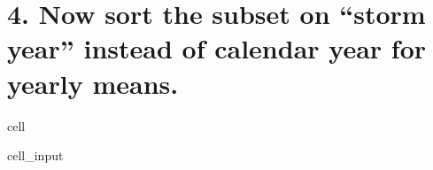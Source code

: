 \documentclass[letterpaper,10pt,english]{jupyterBook}
\begin{document}
\section{4. Now sort the subset on “storm year” instead of calendar year for yearly means.}
\label{\detokenize{notebooks/regional_and_local/SL_anomaly_annual:now-sort-the-subset-on-storm-year-instead-of-calendar-year-for-yearly-means}}
\begin{sphinxuseclass}{cell}\begin{sphinxVerbatimInput}

\begin{sphinxuseclass}{cell_input}
\begin{sphinxVerbatim}[commandchars=\\\{\}]
  

  

\end{sphinxVerbatim}

\end{sphinxuseclass}\end{sphinxVerbatimInput}
\begin{sphinxVerbatimOutput}


\end{sphinxVerbatimOutput}
\end{sphinxuseclass}
\end{document}
